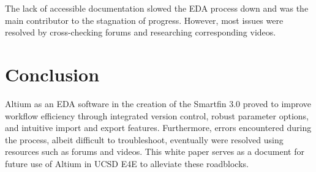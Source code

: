 \documentclass[twocolumn]{article}
\begin{document}
The lack of accessible documentation slowed the EDA process down and was the main contributor to the stagnation of progress. However, most issues were resolved by cross-checking forums and researching corresponding videos.


\section{Conclusion}

Altium as an EDA software in the creation of the Smartfin 3.0 proved to improve workflow efficiency through integrated version control, robust parameter options, and intuitive import and export features. Furthermore, errors encountered during the process, albeit difficult to troubleshoot, eventually were resolved using resources such as forums and videos. This white paper serves as a document for future use of Altium in UCSD E4E to alleviate these roadblocks.

\printbibliography
\end{document}
